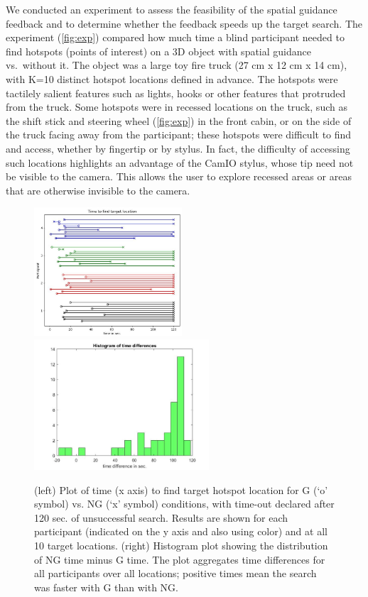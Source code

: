 \documentclass[runningheads]{res/templates/llncs}
\begin{document}
We conducted an experiment to assess the feasibility of the spatial
guidance feedback and to determine whether the feedback speeds up the
target search. The experiment (\ref{fig:exp}) compared how much time a
blind participant needed to find hotspots (points of interest) on a 3D
object with spatial guidance vs.~without it. The object was a large toy
fire truck (27 cm x 12 cm x 14 cm), with K=10 distinct hotspot locations
defined in advance. The hotspots were tactilely salient features such as
lights, hooks or other features that protruded from the truck. Some
hotspots were in recessed locations on the truck, such as the shift
stick and steering wheel (\ref{fig:exp}) in the front cabin, or on the
side of the truck facing away from the participant; these hotspots were
difficult to find and access, whether by fingertip or by stylus. In
fact, the difficulty of accessing such locations highlights an advantage
of the CamIO stylus, whose tip need not be visible to the camera. This
allows the user to explore recessed areas or areas that are otherwise
invisible to the camera.

\begin{figure}
\includegraphics[width=5.5cm, keepaspectratio,]{res/img/fig2a.jpg}
\includegraphics[width=6.5cm, keepaspectratio,]{res/img/fig2b.jpg}
\caption{(left) Plot of time (x axis) to find target hotspot location for G (‘o’ symbol) vs. NG  (‘x’ symbol) conditions, with time-out declared after 120 sec. of unsuccessful search. Results are shown for each participant (indicated on the y axis and also using color) and at all 10 target locations. (right) Histogram plot showing the distribution of NG time minus G time. The plot aggregates time differences for all participants over all locations; positive times mean the search was faster with G than with NG.}
\label{fig:res}
\end{figure}
\end{document}

